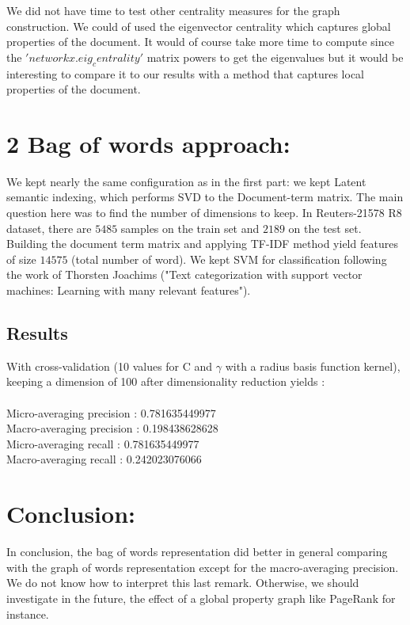 We did not have time to test other centrality measures for the graph construction. We could of used the eigenvector centrality which captures global properties of the document. It would of course take more time to compute since the $'networkx.eig_centrality'$ matrix powers to get the eigenvalues but it would be interesting to compare it to our results with a method that captures local properties of the document.
\section*{2 Bag of words approach:}

We kept nearly the same configuration as in the first part: we kept Latent semantic indexing, which performs SVD to the Document-term matrix.
The main question here was to find the number of dimensions to keep. In Reuters-21578 R8 dataset, there are $5485$ samples on the train set and $2189$ on the test set. Building the document term matrix and applying TF-IDF method yield features of size $14575$ (total number of word). 
We kept SVM for classification following the work of Thorsten Joachims ("Text categorization with support vector machines: Learning with many relevant features").
\subsection*{Results}
With cross-validation (10 values for C and $\gamma$ with a radius basis function kernel), keeping a dimension of 100 after dimensionality reduction yields :~\\
~\\
Micro-averaging precision : 0.781635449977~\\
Macro-averaging precision : 0.198438628628~\\
Micro-averaging recall : 0.781635449977~\\
Macro-averaging recall : 0.242023076066~\\

\section*{Conclusion:}

In conclusion, the bag of words representation did better in general comparing with the graph of words representation except for the macro-averaging precision. We do not know how to interpret this last remark. Otherwise, we should investigate in the future, the effect of a global property graph like PageRank for instance.




